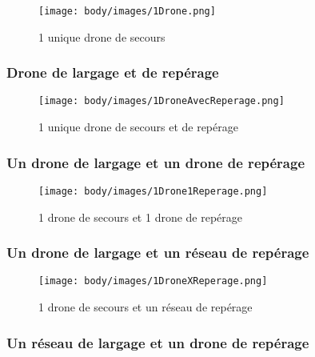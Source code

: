 \begin{figure}[H]
    \begin{center}
        \texttt{[image: body/images/1Drone.png]}
    \end{center}
    \caption{1 unique drone de secours}
    \label{fig:1Largage}
\end{figure}


\subsubsection{Drone de largage et de repérage}

\begin{figure}[H]
    \begin{center}
        \texttt{[image: body/images/1DroneAvecReperage.png]}
    \end{center}
    \caption{1 unique drone de secours et de repérage}
    \label{fig:1DroneEtReperage}
\end{figure}


\subsubsection{Un drone de largage et un drone de repérage}

\begin{figure}[H]
    \begin{center}
        \texttt{[image: body/images/1Drone1Reperage.png]}
    \end{center}
    \caption{1 drone de secours et 1 drone de repérage}
    \label{fig:1Largage1Reperage}
\end{figure}


\subsubsection{Un drone de largage et un réseau de repérage}

\begin{figure}[H]
    \begin{center}
        \texttt{[image: body/images/1DroneXReperage.png]}
    \end{center}
    \caption{1 drone de secours et un réseau de repérage}
    \label{fig:1DroneXDrone}
\end{figure}


\subsubsection{Un réseau de largage et un drone de repérage}

